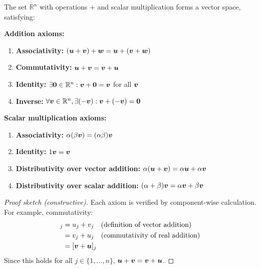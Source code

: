 \begin{theorem}
    The set $\mathbb{R}^n$ with operations $+$ and scalar multiplication forms a vector space, satisfying:

    \textbf{Addition axioms:}
    \begin{enumerate}
        \item \textbf{Associativity:} $(\bm{u} + \bm{v}) + \bm{w} = \bm{u} + (\bm{v} + \bm{w})$
        \item \textbf{Commutativity:} $\bm{u} + \bm{v} = \bm{v} + \bm{u}$
        \item \textbf{Identity:} $\exists \bm{0} \in \mathbb{R}^n: \bm{v} + \bm{0} = \bm{v}$ for all $\bm{v}$
        \item \textbf{Inverse:} $\forall \bm{v} \in \mathbb{R}^n, \exists (-\bm{v}): \bm{v} + (-\bm{v}) = \bm{0}$
    \end{enumerate}

    \textbf{Scalar multiplication axioms:}
    \begin{enumerate}[resume]
        \item \textbf{Associativity:} $\alpha(\beta\bm{v}) = (\alpha\beta)\bm{v}$
        \item \textbf{Identity:} $1\bm{v} = \bm{v}$
        \item \textbf{Distributivity over vector addition:} $\alpha(\bm{u} + \bm{v}) = \alpha\bm{u} + \alpha\bm{v}$
        \item \textbf{Distributivity over scalar addition:} $(\alpha + \beta)\bm{v} = \alpha\bm{v} + \beta\bm{v}$
    \end{enumerate}
\end{theorem}

\begin{proof}[Proof sketch (constructive)]
    Each axiom is verified by component-wise calculation. For example, commutativity:
    \begin{align*}
        [\vect{u} + \vect{v}]_j & = u_j + v_j \quad \text{(definition of vector addition)}  \\
                                & = v_j + u_j \quad \text{(commutativity of real addition)} \\
                                & = [\vect{v} + \vect{u}]_j
    \end{align*}
    Since this holds for all $j \in \{1, \ldots, n\}$, $\bm{u} + \bm{v} = \bm{v} + \bm{u}$.
\end{proof}

